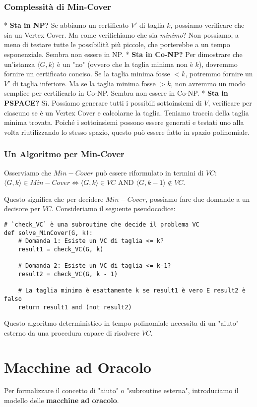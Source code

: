 \documentclass[a4paper, 11pt]{book} %
\theoremstyle{definition}
\begin{document}
\subsubsection{Complessità di Min-Cover}
*   \textbf{Sta in NP?} Se abbiamo un certificato $V'$ di taglia $k$, possiamo verificare che sia un Vertex Cover. Ma come verifichiamo che sia \emph{minimo}? Non possiamo, a meno di testare tutte le possibilità più piccole, che porterebbe a un tempo esponenziale. Sembra non essere in NP.
*   \textbf{Sta in Co-NP?} Per dimostrare che un'istanza $\langle G,k \rangle$ è un "no" (ovvero che la taglia minima non è $k$), dovremmo fornire un certificato conciso. Se la taglia minima fosse $< k$, potremmo fornire un $V'$ di taglia inferiore. Ma se la taglia minima fosse $> k$, non avremmo un modo semplice per certificarlo in Co-NP. Sembra non essere in Co-NP.
*   \textbf{Sta in PSPACE?} Sì. Possiamo generare tutti i possibili sottoinsiemi di $V$, verificare per ciascuno se è un Vertex Cover e calcolarne la taglia. Teniamo traccia della taglia minima trovata. Poiché i sottoinsiemi possono essere generati e testati uno alla volta riutilizzando lo stesso spazio, questo può essere fatto in spazio polinomiale.

\subsubsection{Un Algoritmo per Min-Cover}
Osserviamo che $Min-Cover$ può essere riformulato in termini di $VC$:
$\langle G, k \rangle \in Min-Cover \iff \langle G, k \rangle \in VC \text{ AND } \langle G, k-1 \rangle \notin VC$.

Questo significa che per decidere $Min-Cover$, possiamo fare due domande a un decisore per $VC$.
Consideriamo il seguente pseudocodice:
\begin{verbatim}
# `check_VC` è una subroutine che decide il problema VC
def solve_MinCover(G, k):
    # Domanda 1: Esiste un VC di taglia <= k?
    result1 = check_VC(G, k)

    # Domanda 2: Esiste un VC di taglia <= k-1?
    result2 = check_VC(G, k - 1)

    # La taglia minima è esattamente k se result1 è vero E result2 è falso
    return result1 and (not result2)
\end{verbatim}
Questo algoritmo deterministico in tempo polinomiale necessita di un "aiuto" esterno da una procedura capace di risolvere $VC$.

\section{Macchine ad Oracolo}
Per formalizzare il concetto di "aiuto" o "subroutine esterna", introduciamo il modello delle \textbf{macchine ad oracolo}.
\end{document}
